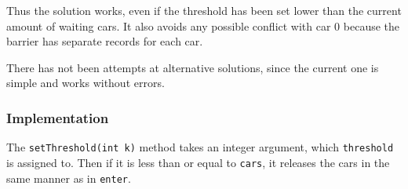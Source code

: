 Thus the solution works, even if the threshold has been set lower than the current amount of waiting cars. It also avoids any possible conflict with car $0$ because the barrier has separate records for each car.

There has not been attempts at alternative solutions, since the current one is simple and works without errors.

\subsubsection{Implementation}
The \texttt{setThreshold(int k)} method takes an integer argument, which \texttt{threshold} is assigned to. Then if it is less than or equal to \texttt{cars}, it releases the cars in the same manner as in \texttt{enter}.